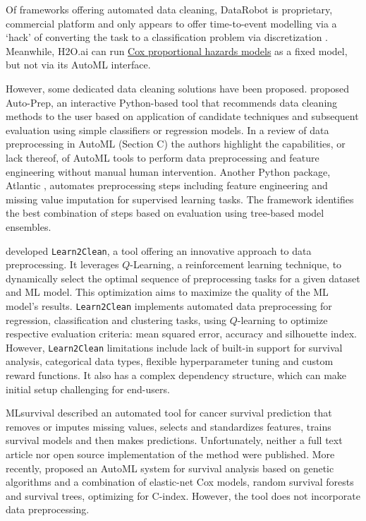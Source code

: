 Of frameworks offering automated data cleaning, DataRobot is
proprietary, commercial platform and only appears to offer time-to-event
modelling via a `hack' of converting the task to a classification
problem via discretization \citep[see e.g.][]{craig_survival_2021}.
Meanwhile, H2O.ai can run
\href{https://docs.h2o.ai/h2o/latest-stable/h2o-docs/data-science/coxph.html}{Cox
proportional hazards models} as a fixed model, but not via its AutoML
interface.

However, some dedicated data cleaning solutions have been proposed.
\citet{bilal2022} proposed Auto-Prep, an interactive Python-based tool
that recommends data cleaning methods to the user based on application
of candidate techniques and subsequent evaluation using simple
classifiers or regression models. In a review of data preprocessing in
AutoML (Section C) the authors highlight the capabilities, or lack
thereof, of AutoML tools to perform data preprocessing and feature
engineering without manual human intervention. Another Python package,
Atlantic \citep{santos2023}, automates preprocessing steps including
feature engineering and missing value imputation for supervised learning
tasks. The framework identifies the best combination of steps based on
evaluation using tree-based model ensembles.

\citet{learn2clean_2019} developed \texttt{Learn2Clean}, a tool offering
an innovative approach to data preprocessing. It leverages
\(Q\)-Learning, a reinforcement learning technique, to dynamically
select the optimal sequence of preprocessing tasks for a given dataset
and ML model. This optimization aims to maximize the quality of the ML
model's results. \texttt{Learn2Clean} implements automated data
preprocessing for regression, classification and clustering tasks, using
\(Q\)-learning to optimize respective evaluation criteria: mean squared
error, accuracy and silhouette index. However, \texttt{Learn2Clean}
limitations include lack of built-in support for survival analysis,
categorical data types, flexible hyperparameter tuning and custom reward
functions. It also has a complex dependency structure, which can make
initial setup challenging for end-users.

MLsurvival \citep{zhou2020} described an automated tool for cancer
survival prediction that removes or imputes missing values, selects and
standardizes features, trains survival models and then makes
predictions. Unfortunately, neither a full text article nor open source
implementation of the method were published. More recently,
\citet{pomsuwan2024} proposed an AutoML system for survival analysis
based on genetic algorithms and a combination of elastic-net Cox models,
random survival forests and survival trees, optimizing for C-index.
However, the tool does not incorporate data preprocessing.